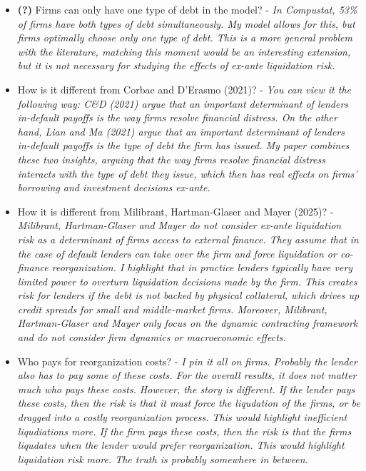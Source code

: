 \documentclass[12pt]{article}
\begin{document}
\begin{itemize}
    \item \textbf{(?)} Firms can only have one type of debt in the model? - \textit{In Compustat, 53\% of firms have both types of debt simultaneously. My model allows for this, but firms optimally choose only one type of debt. This is a more general problem with the literature, matching this moment would be an interesting extension, but it is not necessary for studying the effects of ex-ante liquidation risk.}
    \item How is it different from Corbae and D'Erasmo (2021)? - \textit{You can view it the following way: C\&D (2021) argue that an important determinant of lenders in-default payoffs is the way firms resolve financial distress. On the other hand, Lian and Ma (2021) argue that an important determinant of lenders in-default payoffs is the type of debt the firm has issued. My paper combines these two insights, arguing that the way firms resolve financial distress interacts with the type of debt they issue, which then has real effects on firms' borrowing and investment decisions ex-ante.}
    \item How it is different from Milibrant, Hartman-Glaser and Mayer (2025)? - \textit{Milibrant, Hartman-Glaser and Mayer do not consider ex-ante liquidation risk as a determinant of firms access to external finance. They assume that in the case of default lenders can take over the firm and force liquidation or co-finance reorganization. I highlight that in practice lenders typically have very limited power to overturn liquidation decisions made by the firm. This creates risk for lenders if the debt is not backed by physical collateral, which drives up credit spreads for small and middle-market firms. Moreover, Milibrant, Hartman-Glaser and Mayer only focus on the dynamic contracting framework and do not consider firm dynamics or macroeconomic effects.}
    \item Who pays for reorganization costs? - \textit{I pin it all on firms. Probably the lender also has to pay some of these costs. For the overall results, it does not matter much who pays these costs. However, the story is different. If the lender pays these costs, then the risk is that it must force the liqudation of the firms, or be dragged into a costly reorganization process. This would highlight inefficient liqudiations more. If the firm pays these costs, then the risk is that the firms liqudates when the lender would prefer reorganization. This would highlight liquidation risk more. The truth is probably somewhere in between.}
\end{itemize} \normalsize
\end{document}
